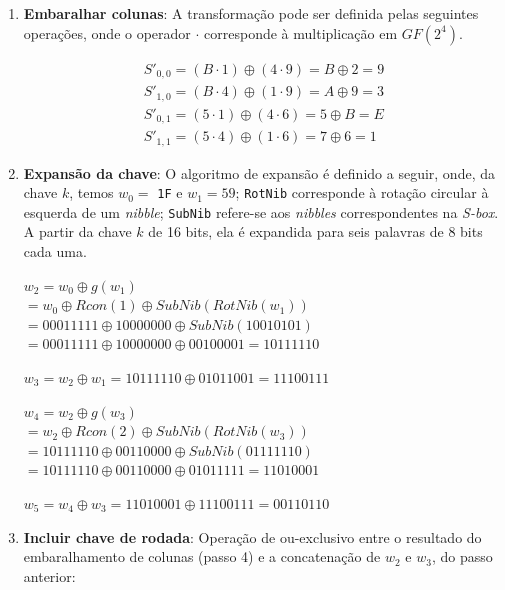 \documentclass{article}
\begin{document}
\begin{enumerate}
    \item \textbf{Embaralhar colunas}: A transformação pode ser definida pelas
    seguintes operações, onde o operador $\cdot$ corresponde à multiplicação em
    $GF(2^{4})$.
    \begin{center}
        \begin{gather*}
            S'_{0, 0} = (B \cdot 1) \oplus (4 \cdot 9) = B \oplus 2 = 9 \\
            S'_{1, 0} = (B \cdot 4) \oplus (1 \cdot 9) = A \oplus 9 = 3 \\
            S'_{0, 1} = (5 \cdot 1) \oplus (4 \cdot 6) = 5 \oplus B = E \\
            S'_{1, 1} = (5 \cdot 4) \oplus (1 \cdot 6) = 7 \oplus 6 = 1
        \end{gather*}
    \end{center}
    
    \item \textbf{Expansão da chave}: O algoritmo de expansão é definido a
    seguir, onde, da chave $k$, temos $w_{0} =$ \texttt{1F} e $w_{1} = 59$;
    \texttt{RotNib} corresponde à rotação circular à esquerda de um
    \textit{nibble}; \texttt{SubNib} refere-se aos \textit{nibbles}
    correspondentes na \textit{S-box}. A partir da chave $k$ de 16 bits, ela é
    expandida para seis palavras de 8 bits cada uma.

    $w_{2} = w_{0} \oplus g(w_{1})$ \\
    $= w_{0} \oplus Rcon(1) \oplus SubNib(RotNib(w_{1}))$ \\
    $= 00011111 \oplus 10000000 \oplus SubNib(10010101)$ \\
    $= 00011111 \oplus 10000000 \oplus 00100001 = 10111110$
    
    $w_{3} = w_{2} \oplus w_{1} = 10111110 \oplus 01011001 = 11100111$
    
    $w_{4} = w_{2} \oplus g(w_{3})$ \\
    $= w_{2} \oplus Rcon(2) \oplus SubNib(RotNib(w_{3}))$ \\
    $= 10111110 \oplus 00110000 \oplus SubNib(01111110)$ \\
    $= 10111110 \oplus 00110000 \oplus 01011111 = 11010001$
    
    $w_{5} = w_{4} \oplus w_{3} = 11010001 \oplus 11100111 = 00110110$
    
    \item \textbf{Incluir chave de rodada}: Operação de ou-exclusivo entre o
    resultado do embaralhamento de colunas (passo 4) e a concatenação de
    $w_{2}$ e $w_{3}$, do passo anterior:
    

\end{enumerate}
\end{document}
